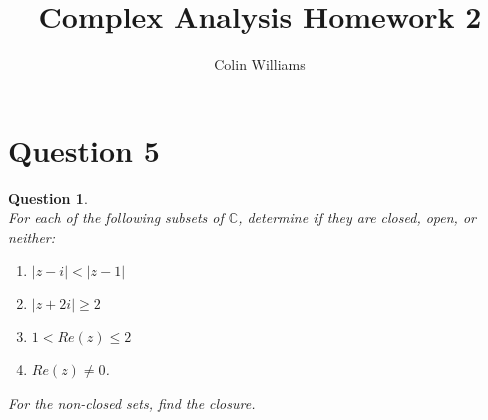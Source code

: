 \documentclass[10pt,a4paper]{article}
\title{Complex Analysis Homework 2}
\author{Colin Williams}
\newtheorem*{question*}{Question}
\theoremstyle{definition}
\begin{document}
\maketitle
\section*{Question 5}
\begin{question*}{$ $}
\\For each of the following subsets of $\mathbb{C}$, determine if they are closed, open, or neither:
\begin{enumerate}[label = \alph*.)]
\item $|z - i| < |z - 1|$
\item $|z + 2i| \geq 2$
\item $1 < Re(z) \leq 2$
\item $Re(z) \neq 0$.
\end{enumerate}
 For the non-closed sets, find the closure.
\end{question*}
\end{document}

